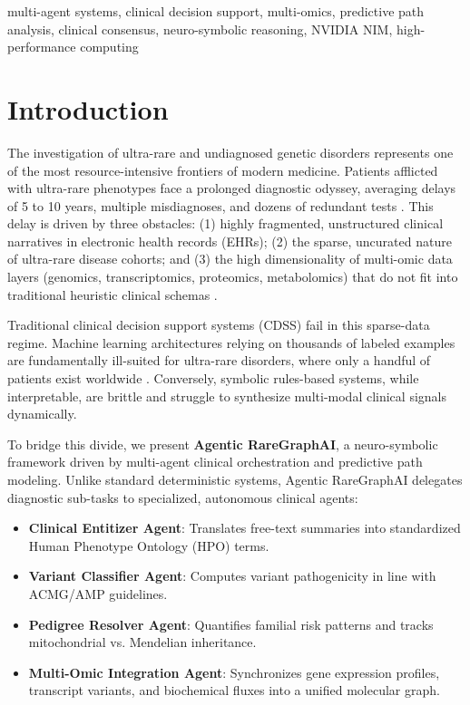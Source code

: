 \documentclass[conference]{IEEEtran}
\begin{document}
\begin{IEEEkeywords}
multi-agent systems, clinical decision support, multi-omics, predictive path analysis, clinical consensus, neuro-symbolic reasoning, NVIDIA NIM, high-performance computing
\end{IEEEkeywords}

\section{Introduction}
The investigation of ultra-rare and undiagnosed genetic disorders represents one of the most resource-intensive frontiers of modern medicine. Patients afflicted with ultra-rare phenotypes face a prolonged diagnostic odyssey, averaging delays of 5 to 10 years, multiple misdiagnoses, and dozens of redundant tests \cite{ref1}. This delay is driven by three obstacles: (1) highly fragmented, unstructured clinical narratives in electronic health records (EHRs); (2) the sparse, uncurated nature of ultra-rare disease cohorts; and (3) the high dimensionality of multi-omic data layers (genomics, transcriptomics, proteomics, metabolomics) that do not fit into traditional heuristic clinical schemas \cite{ref2}.

Traditional clinical decision support systems (CDSS) fail in this sparse-data regime. Machine learning architectures relying on thousands of labeled examples are fundamentally ill-suited for ultra-rare disorders, where only a handful of patients exist worldwide \cite{ref3}. Conversely, symbolic rules-based systems, while interpretable, are brittle and struggle to synthesize multi-modal clinical signals dynamically.

To bridge this divide, we present \textbf{Agentic RareGraphAI}, a neuro-symbolic framework driven by multi-agent clinical orchestration and predictive path modeling. Unlike standard deterministic systems, Agentic RareGraphAI delegates diagnostic sub-tasks to specialized, autonomous clinical agents:
\begin{itemize}
    \item \textbf{Clinical Entitizer Agent}: Translates free-text summaries into standardized Human Phenotype Ontology (HPO) terms.
    \item \textbf{Variant Classifier Agent}: Computes variant pathogenicity in line with ACMG/AMP guidelines.
    \item \textbf{Pedigree Resolver Agent}: Quantifies familial risk patterns and tracks mitochondrial vs. Mendelian inheritance.
    \item \textbf{Multi-Omic Integration Agent}: Synchronizes gene expression profiles, transcript variants, and biochemical fluxes into a unified molecular graph.
\end{itemize}
\end{document}
